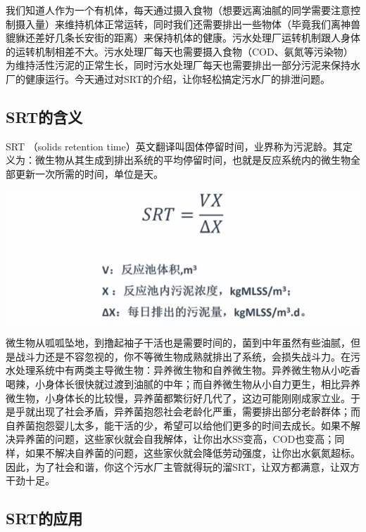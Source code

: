 \documentclass[]{book}
\begin{document}
我们知道人作为一个有机体，每天通过摄入食物（想要远离油腻的同学需要注意控制摄入量）来维持机体正常运转，同时我们还需要排出一些物体（毕竟我们离神兽貔貅还差好几条长安街的距离）来保持机体的健康。污水处理厂运转机制跟人身体的运转机制相差不大。污水处理厂每天也需要摄入食物（COD、氨氮等污染物）为维持活性污泥的正常生长，同时污水处理厂每天也需要排出一部分污泥来保持水厂的健康运行。今天通过对SRT的介绍，让你轻松搞定污水厂的排泄问题。

\hypertarget{srtux7684ux542bux4e49}{%
\subsection{SRT的含义}\label{srtux7684ux542bux4e49}}

SRT （solids retention time）英文翻译叫固体停留时间，业界称为污泥龄。其定义为：微生物从其生成到排出系统的平均停留时间，也就是反应系统内的微生物全部更新一次所需的时间，单位是天。

\includegraphics[width=8.33in]{images/srt1}

微生物从呱呱坠地，到撸起袖子干活也是需要时间的，菌到中年虽然有些油腻，但是战斗力还是不容忽视的，你不等微生物成熟就排出了系统，会损失战斗力。在污水处理系统中有两类主导微生物：异养微生物和自养微生物。异养微生物从小吃香喝辣，小身体长很快就过渡到油腻的中年；而自养微生物从小自力更生，相比异养微生物，小身体长的比较慢，异养菌都繁衍好几代了，这边可能刚刚成家立业。于是乎就出现了社会矛盾，异养菌抱怨社会老龄化严重，需要排出部分老龄群体；而自养菌抱怨婴儿太多，能干活的少，希望可以给他们更多的时间去成长。如果不解决异养菌的问题，这些家伙就会自我解体，让你出水SS变高，COD也变高；同样，如果不解决自养菌的问题，这些家伙就会降低劳动强度，让你出水氨氮超标。因此，为了社会和谐，你这个污水厂主管就得玩的溜SRT，让双方都满意，让双方干劲十足。

\hypertarget{srtux7684ux5e94ux7528}{%
\subsection{SRT的应用}\label{srtux7684ux5e94ux7528}}
\end{document}
